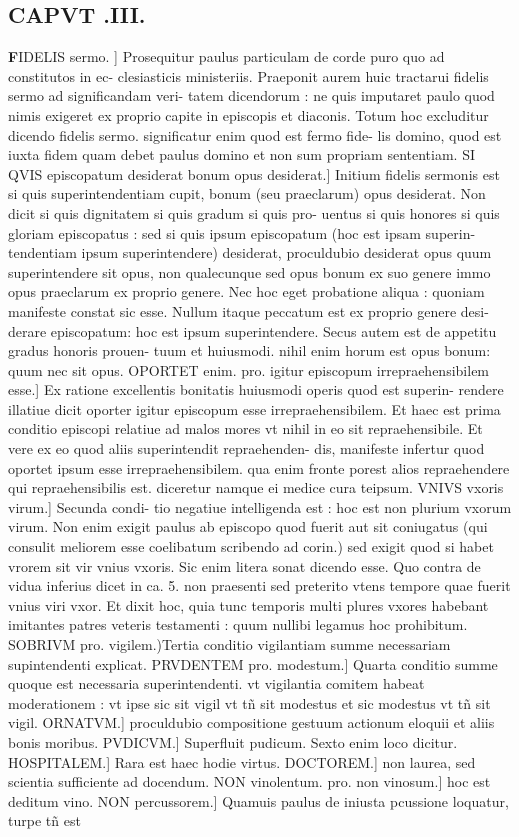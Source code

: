 \documentclass{article}
\begin{document}
\begin{pages}
\endnumbering\beginnumbering\section{CAPVT .III.}\pstart \huge\textbf{F}\normalsize IDELIS sermo. ] Prosequitur paulus particulam de corde puro quo ad constitutos in ec- clesiasticis ministeriis. Praeponit aurem huic tractarui fidelis sermo ad significandam veri- tatem dicendorum : ne quis imputaret paulo quod nimis exigeret ex proprio capite in episcopis et diaconis. Totum hoc excluditur dicendo fidelis sermo. significatur enim quod est fermo fide- lis domino, quod est iuxta fidem quam debet paulus domino et non sum propriam sententiam. SI QVIS episcopatum desiderat bonum opus desiderat.] Initium fidelis sermonis est si quis superintendentiam cupit, bonum (seu praeclarum) opus desiderat. Non dicit si quis dignitatem si quis gradum si quis pro- uentus si quis honores si quis gloriam episcopatus : sed si quis ipsum episcopatum (hoc est ipsam superin- tendentiam ipsum superintendere) desiderat, proculdubio desiderat opus quum superintendere sit opus, non qualecunque sed opus bonum ex suo genere immo opus praeclarum ex proprio genere. Nec hoc eget probatione aliqua : quoniam manifeste constat sic esse. Nullum itaque peccatum est ex proprio genere desi- derare episcopatum: hoc est ipsum superintendere. Secus autem est de appetitu gradus honoris prouen- tuum et huiusmodi. nihil enim horum est opus bonum: quum nec sit opus. OPORTET enim. pro. igitur  episcopum irrepraehensibilem esse.] Ex ratione excellentis bonitatis huiusmodi operis quod est superin- rendere illatiue dicit oporter igitur episcopum esse irrepraehensibilem. Et haec est prima conditio episcopi relatiue ad malos mores vt nihil in eo sit repraehensibile. Et vere ex eo quod aliis superintendit repraehenden- dis, manifeste infertur quod oportet ipsum esse irrepraehensibilem. qua enim fronte porest alios repraehendere qui repraehensibilis est. diceretur namque ei medice cura teipsum. VNIVS vxoris virum.] Secunda condi- tio negatiue intelligenda est : hoc est non plurium vxorum virum. Non enim exigit paulus ab episcopo quod fuerit aut sit coniugatus (qui consulit meliorem esse coelibatum scribendo ad corin.) sed exigit quod si habet vrorem sit vir vnius vxoris. Sic enim litera sonat dicendo esse. Quo contra de vidua inferius dicet in ca. 5. non praesenti sed preterito vtens tempore quae fuerit vnius viri vxor. Et dixit hoc, quia tunc temporis multi plures vxores habebant imitantes patres veteris testamenti : quum nullibi legamus hoc prohibitum. SOBRIVM pro. vigilem.)Tertia conditio vigilantiam summe necessariam supintendenti explicat. PRVDENTEM pro. modestum.] Quarta conditio summe quoque est necessaria superintendenti. vt vigilantia comitem habeat moderationem : vt ipse sic sit vigil vt tñ sit modestus et sic modestus vt tñ sit vigil. ORNATVM.] proculdubio compositione gestuum actionum eloquii et aliis bonis moribus. PVDICVM.] Superfluit pudicum. Sexto enim loco dicitur. HOSPITALEM.] Rara est haec hodie virtus. DOCTOREM.] non laurea, sed scientia sufficiente ad docendum. NON vinolentum. pro. non vinosum.] hoc est deditum vino. NON percussorem.] Quamuis paulus de iniusta pcussione loquatur, turpe tñ est 
\end{pages}
\end{document}
